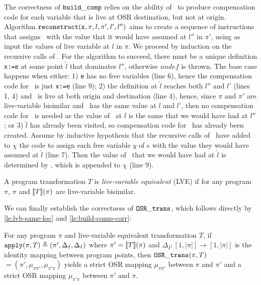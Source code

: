 \begin{myproof}
\missing
The correctness of ${\tt build\_comp}$ relies on the ability of \reconstruct\ to produce compensation code for each variable that is live at OSR destination, but not at origin. Algorithm $\text{${\tt reconstruct}$}(\text{${\tt x}$}, \pi, l, \pi', l', l'')$ aims to create a sequence of instructions that assigns \wx\ with the value that it would have assumed at $l''$ in $\pi'$, using as input the values of live variable at $l$ in $\pi$. We proceed by induction on the recursive calls of \reconstruct. For the algorithm to succeed, there must be a unique definition {\tt x:=e} at some point $\hat{l}$ that dominates $l''$, otherwise $undef$ is thrown. %
The base case happens when either: 1) {\tt e} has no free variables (line 6), hence the compensation code for \wx\ is just {\tt x:=e} (line 9); 2) the definition at $\hat{l}$ reaches both $l''$ and $l'$ (lines 1, 4) and \wx\ is live at both origin and destination (line 4), hence, since $\pi$ and $\pi'$ are live-variable bisimilar and \wx\ has the same value at $l$ and $l'$, then no compensation code for \wx\ is needed as the value of \wx\ at $l$ is the same that we would have had at $l''$; or 3) $\hat{l}$ has already been visited, so compensation code for \wx\ has already been created. Assume by inductive hypothesis that the recursive calls of \reconstruct\ have added to $\chi$ the code to assign each free variable $y$ of $e$ with the value they would have assumed at $\hat{l}$ (line 7). Then the value of \wx\ that we would have had at $\hat{l}$ is determined by , which is appended to $\chi$ (line 9).
\end{myproof}

\begin{definition}
\label{de:lve-trans}
A program transformation $T$ is {\em live-variable equivalent} (LVE) if for any program $\pi$, $\pi$ and $[\![T]\!](\pi)$ are live-variable bisimilar.
\end{definition}

\noindent We can finally establish the correctness of ${\tt OSR\_trans}$, which follows directly by \mylemma\ref{le:lvb-same-loc} and \mylemma\ref{le:build-comp-corr}:

\begin{theorem}
\label{th:osr-trans-correctness}
For any program $\pi$ and live-variable equivalent transformation $T$, if ${\tt apply}(\pi,T)\triangleq(\pi', \Delta_I, \Delta_I)$ where $\pi'=[\![T]\!](\pi)$ and $\Delta_I:[1,|\pi|]\rightarrow [1,|\pi|]$ is the identity mapping between program points, then ${\tt OSR\_trans}(\pi,T)$ $=(\pi',\mu_{\pi\pi'},\mu_{\pi'\pi})$ yields a strict OSR mapping $\mu_{\pi\pi'}$ between $\pi$ and $\pi'$ and a strict OSR mapping $\mu_{\pi'\pi}$ between $\pi'$ and $\pi$.
\end{theorem}

